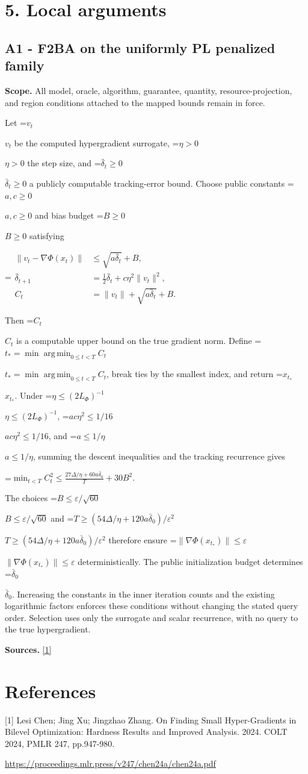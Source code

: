 \documentclass[10pt,a4paper]{article}
\newcommand{\AtlasMath}[1]{\par\begingroup\centering\setbox0=\hbox{$\displaystyle #1$}\ifdim\wd0>1.4\linewidth\typeout{ATLAS WIDE FORMULA: \the\wd0}\fi\ifdim\wd0>\linewidth\resizebox{\linewidth}{!}{\box0}\else\box0\fi\par\endgroup}
\newcommand{\AtlasInlineMath}[1]{\begingroup\setbox0=\hbox{$#1$}\ifdim\wd0>.4\linewidth\endgroup\AtlasMath{#1}\else\endgroup$#1$\fi}
\begin{document}
\section{5. Local arguments}
\subsection{A1 - F2BA on the uniformly PL penalized family}
\textbf{Scope.} All model, oracle, algorithm, guarantee, quantity, resource-projection, and region conditions attached to the mapped bounds remain in force.

Let \AtlasInlineMath{v_t} be the computed hypergradient surrogate, \AtlasInlineMath{\eta>0} the step size, and \AtlasInlineMath{\bar\delta_t\ge0} a publicly computable tracking-error bound. Choose public constants \AtlasInlineMath{a,c\ge0} and bias budget \AtlasInlineMath{B\ge0} satisfying

\AtlasMath{\begin{aligned}
\|v_t-\nabla\Phi(x_t)\|&\le\sqrt{a\bar\delta_t}+B,\\
\bar\delta_{t+1}&=\tfrac12\bar\delta_t+c\eta^2\|v_t\|^2,\\
C_t&=\|v_t\|+\sqrt{a\bar\delta_t}+B.
\end{aligned}}

Then \AtlasInlineMath{C_t} is a computable upper bound on the true gradient norm. Define \AtlasInlineMath{t_* = \min\operatorname*{arg\,min}_{0\le t<T} C_t}, break ties by the smallest index, and return \AtlasInlineMath{x_{t_*}}. Under \AtlasInlineMath{\eta\le(2L_\Phi)^{-1}}, \AtlasInlineMath{ac\eta^2\le1/16}, and \AtlasInlineMath{a\le1/\eta}, summing the descent inequalities and the tracking recurrence gives

\AtlasMath{\min_{t<T}C_t^2\le\frac{27\Delta/\eta+60a\bar\delta_0}{T}+30B^2.}

The choices \AtlasInlineMath{B\le\varepsilon/\sqrt{60}} and \AtlasInlineMath{T\ge(54\Delta/\eta+120a\bar\delta_0)/\varepsilon^2} therefore ensure \AtlasInlineMath{\|\nabla\Phi(x_{t_*})\|\le\varepsilon} deterministically. The public initialization budget determines \AtlasInlineMath{\bar\delta_0}. Increasing the constants in the inner iteration counts and the existing logarithmic factors enforces these conditions without changing the stated query order. Selection uses only the surrogate and scalar recurrence, with no query to the true hypergradient.

\textbf{Sources.} \href{https://proceedings.mlr.press/v247/chen24a/chen24a.pdf}{[1]}

\section{References}
[1] Lesi Chen; Jing Xu; Jingzhao Zhang. On Finding Small Hyper-Gradients in Bilevel Optimization: Hardness Results and Improved Analysis. 2024. COLT 2024, PMLR 247, pp.947-980.

\url{https://proceedings.mlr.press/v247/chen24a/chen24a.pdf}
\end{document}
